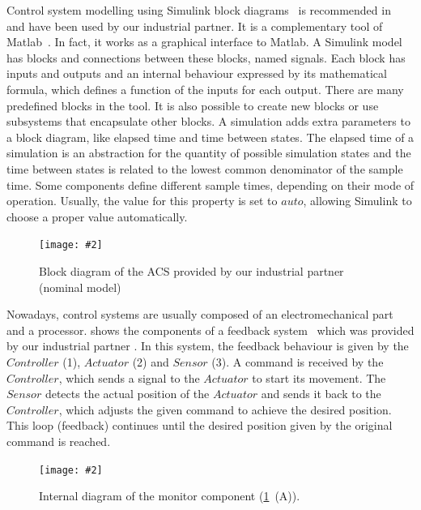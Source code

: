\documentclass[12pt,openright,twoside,a4paper,oldfontcommands,english,brazil,final]{abntex2}
\theoremstyle{theo}
\newcommand{\includegraphicsaspectratio}[2][1]{%
  \texttt{[image: \#2]}%
}
\def\embraer{%
  our industrial partner%
  \xspace%
}
\newcommand{\matlab}{\textsf{Matlab}\xspace}
\newcommand{\textsim}[1]{$#1$}
\newcommand{\simulink}{Simulink\xspace}
\begin{document}
Control system modelling using \simulink block diagrams~\cite{MathWorks2010} is recommended in~\cite{Nise1992} and have been used by our industrial partner.
It is a complementary tool of \matlab~\cite{MathWorks2010c}.
In fact, it works as a graphical interface to \matlab.
A \simulink model has blocks and connections between these blocks, named signals.
Each block has inputs and outputs and an internal behaviour expressed by its mathematical formula, which defines a function of the inputs for each output.
There are many predefined blocks in the tool.
It is also possible to create new blocks or use subsystems that encapsulate other blocks.
A simulation adds extra parameters to a block diagram, like elapsed time and time between states.
The elapsed time of a simulation is an abstraction for the quantity of possible simulation states and the time between states is related to the lowest common denominator of the sample time.
Some components define different sample times, depending on their mode of operation.
Usually, the value for this property is set to \textsim{auto}, allowing \simulink to choose a proper value automatically.

\begin{figure}[htb]
  \centering
  \includegraphicsaspectratio{acsBlockDiagrams}
  \caption{Block diagram of the ACS provided by \embraer (nominal model)}
  \label{fg:acsBlockDiagrams}
\end{figure}

Nowadays, control systems are usually composed of an electromechanical part and a processor.
 shows the components of a feedback system~\cite{AM2008} which was provided by \embraer.
In this system, the feedback behaviour is given by the \textsim{Controller} (1), \textsim{Actuator} (2) and \textsim{Sensor} (3). A command is received by the \textsim{Controller}, which sends a signal to the \textsim{Actuator} to start its movement.
The \textsim{Sensor} detects the actual position of the \textsim{Actuator} and sends it back to the \textsim{Controller}, which adjusts the given command to achieve the desired position. This loop (feedback) continues until the desired position given by the original command is reached.

\begin{figure}[htb]
  \centering
  \includegraphicsaspectratio[0.6]{blockDiagramMonitorInternals}
  \caption{Internal diagram of the monitor component (\cref{fg:acsBlockDiagrams}~(A)).}
  \label{fg:blockDiagramMonitorInternals}
\end{figure}
\end{document}
